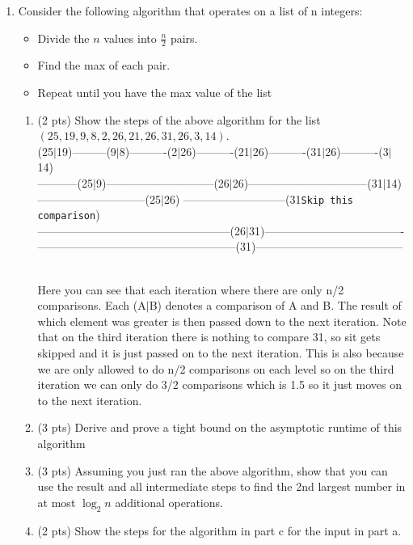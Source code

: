 \documentclass[12pt]{article}
\begin{document}
\begin{enumerate}
\item Consider the following algorithm that operates on a list of n integers:
\begin{itemize}
    \item Divide the $n$ values into $\frac{n}{2}$ pairs.
    \item Find the max of each pair.
    \item Repeat until you have the max value of the list
\end{itemize}

\begin{enumerate}
    \item (2 pts) Show the steps of the above algorithm for the list $(25, 19, 9, 8, 2, 26, 21, 26, 31, 26, 3, 14)$.\\
    	 (25$\mid$19)---------(9$\mid$8)----------(2$\mid$26)----------(21$\mid$26)----------(31$\mid$26)----------(3$\mid$14)\\
		 -----------(25$\mid$9)-----------------------------(26$\mid$26)--------------------------------(31$\mid$14)\\
		 -----------------------------(25$\mid$26) ---------------------------(31{\tt*Skip this comparison})\\
		 ---------------------------------------------------(26$\mid$31)-------------------------------------\\
		 -----------------------------------------------------(31)---------------------------------------\\\\
	   \par Here you can see that each iteration where there are only n/2 comparisons. Each (A$\mid$B) denotes a comparison of A and B. The 		result of which element was greater is then passed down to the next iteration. Note that on the third iteration there is nothing to 		compare 31, so sit gets skipped and it is just passed on to the next iteration. This is also because we are only allowed to do n/2 			comparisons on each level so on the third iteration we can only do 3/2 comparisons which is 1.5 so it just moves on to the next 			iteration.  
    \pagebreak	
    \item (3 pts) Derive and prove a tight bound on the asymptotic runtime of this algorithm
    \pagebreak	
    \item (3 pts) Assuming you just ran the above algorithm, show that you can
    use the result and all intermediate steps to find the 2nd largest number in
    at most $\log_{2}n$ additional operations.
    \pagebreak	
    \item (2 pts) Show the steps for the algorithm in part c for the input in
    part a.
    \pagebreak	
\end{enumerate}


\end{enumerate}
\end{document}
